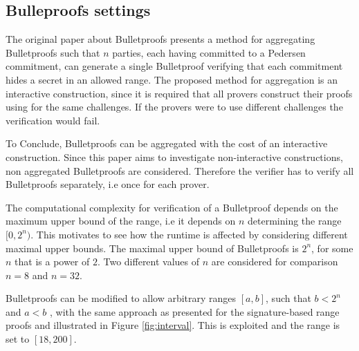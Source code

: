 \subsection*{Bulleproofs settings}
The original paper about Bulletproofs \cite{bulletProofs_theory} presents a method for aggregating Bulletproofs such that $n$ parties, each having committed to a Pedersen commitment, can generate a single Bulletproof verifying that each commitment hides a secret in an allowed range. The proposed method for aggregation is an interactive construction, since it is required that all provers construct their proofs using for the same challenges. If the provers were to use different challenges the verification would fail.

To Conclude, Bulletproofs can be aggregated with the cost of an interactive construction. Since this paper aims to investigate non-interactive constructions,  non aggregated Bulletproofs are considered. Therefore the verifier has to verify all Bulletproofs separately, i.e once for each prover. 

The computational complexity for verification of a Bulletproof depends on the maximum upper bound of the range, i.e it depends on $n$ determining the range $[0,2^n)$. This motivates to see how the runtime is affected by considering different maximal upper bounds.  The maximal upper bound of Bulletproofs is $2^n$, for some $n$ that is a power of $2$. Two different values of $n$ are considered for comparison $n=8 $ and $n=32$. 

Bulletproofs can be modified to allow arbitrary ranges $[a,b]$, such that $b<2^n$ and $a<b$ , with the same approach as presented for the signature-based range proofs and illustrated in Figure \ref{fig:interval}. This is exploited and the range is set to $[18,200]$. 

 


